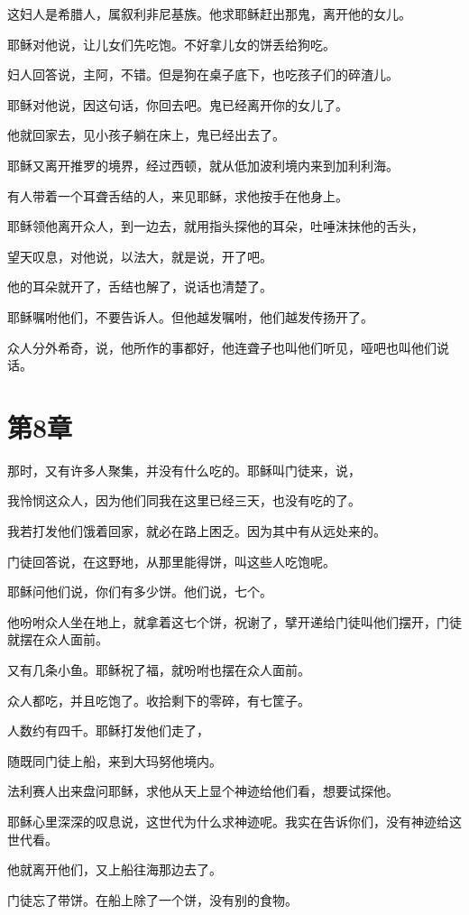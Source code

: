 \documentclass[12pt,oneside]{book}
\begin{document}
这妇人是希腊人，属叙利非尼基族。他求耶稣赶出那鬼，离开他的女儿。

耶稣对他说，让儿女们先吃饱。不好拿儿女的饼丢给狗吃。

妇人回答说，主阿，不错。但是狗在桌子底下，也吃孩子们的碎渣儿。

耶稣对他说，因这句话，你回去吧。鬼已经离开你的女儿了。

他就回家去，见小孩子躺在床上，鬼已经出去了。

耶稣又离开推罗的境界，经过西顿，就从低加波利境内来到加利利海。

有人带着一个耳聋舌结的人，来见耶稣，求他按手在他身上。

耶稣领他离开众人，到一边去，就用指头探他的耳朵，吐唾沫抹他的舌头，

望天叹息，对他说，以法大，就是说，开了吧。

他的耳朵就开了，舌结也解了，说话也清楚了。

耶稣嘱咐他们，不要告诉人。但他越发嘱咐，他们越发传扬开了。

众人分外希奇，说，他所作的事都好，他连聋子也叫他们听见，哑吧也叫他们说话。

\chapter{第8章}
那时，又有许多人聚集，并没有什么吃的。耶稣叫门徒来，说，

我怜悯这众人，因为他们同我在这里已经三天，也没有吃的了。

我若打发他们饿着回家，就必在路上困乏。因为其中有从远处来的。

门徒回答说，在这野地，从那里能得饼，叫这些人吃饱呢。

耶稣问他们说，你们有多少饼。他们说，七个。

他吩咐众人坐在地上，就拿着这七个饼，祝谢了，擘开递给门徒叫他们摆开，门徒就摆在众人面前。

又有几条小鱼。耶稣祝了福，就吩咐也摆在众人面前。

众人都吃，并且吃饱了。收拾剩下的零碎，有七筐子。

人数约有四千。耶稣打发他们走了，

随既同门徒上船，来到大玛努他境内。

法利赛人出来盘问耶稣，求他从天上显个神迹给他们看，想要试探他。

耶稣心里深深的叹息说，这世代为什么求神迹呢。我实在告诉你们，没有神迹给这世代看。

他就离开他们，又上船往海那边去了。

门徒忘了带饼。在船上除了一个饼，没有别的食物。
\end{document}
